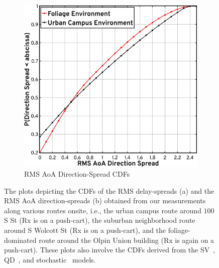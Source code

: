 \documentclass[10pt, twocolumn]{IEEEtran}
\begin{document}
{\begin{figure} [t]
\begin{subfigure}{0.495\linewidth}
        \includegraphics[width=1.0\linewidth]{figs/rms_direction_spread.pdf}
        \caption{RMS AoA Direction-Spread CDFs}
        \label{F11b}
    \end{subfigure}
    \vspace{-8mm}
    \caption{The plots depicting the CDFs of the RMS delay-spreads (a) and the RMS AoA direction-spreads (b) obtained from our measurements along various routes onsite, i.e., the urban campus route around $100$ S St (Rx is on a push-cart), the suburban neighborhood route around S Wolcott St (Rx is on a push-cart), and the foliage-dominated route around the Olpin Union building (Rx is again on a push-cart). These plots also involve the CDFs derived from the SV~\cite{SV_Molisch}, QD~\cite{QDC_NIST}, and stochastic~\cite{Indoor60G} models.}
    \label{F11}
\end{figure}

}
\end{document}
